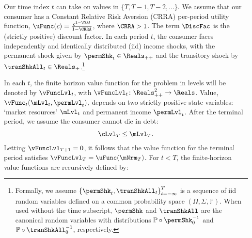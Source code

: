 \documentclass[\econtexRoot/BufferStockTheory]{subfiles}
\begin{document}
Our time index $t$ can take on values in $\{T,T-1,T-2,\dots \}$. We assume that our consumer has a Constant Relative Risk Aversion (CRRA) per-period utility function, $\uFunc(c)=\frac{c^{1-\CRRA}}{1-\CRRA}$, where $\CRRA>1$. The term $\DiscFac$ is the (strictly positive) discount factor. In each period $t$, the consumer faces independently and identically distributed (iid) income shocks, with the permanent shock given by $\permShk_{t} \in \Reals_{++}$ and the transitory shock by $\tranShkAll_{t} \in \Reals_{+}$.\footnote{Formally, we assume $\left\{\permShk_{t},\tranShkAll_{t}\right\}_{t=-\infty}^{T}$ is a sequence of iid random variables defined on a common probability space $(\Omega, \Sigma, \mathbb{P})$. When used without the time subscript, $\permShk$ and $\tranShkAll$ are the canonical random variables with distributions $\mathbb{P}\circ \permShk_{0}^{-1}$ and $\mathbb{P}\circ \tranShkAll_{0}^{-1}$, respectively.}

In each $t$, the finite horizon value function for the problem in levels will be denoted by $\vFuncLvl_{t}$, with $\vFuncLvl_{t}\colon \Reals_{++}^{2}\rightarrow \Reals$. Value, $\vFunc_{t}(\mLvl_{t}, \permLvl_{t})$, depends on two strictly positive state variables: `market resources' $\mLvl_{t}$ and permanent income $\permLvl_{t}$.
After the terminal period, we assume the consumer cannot die in debt:
%
\begin{equation}\label{eq:NoDebtAtDeath}
\cLvl_{T} \leq  \mLvl_{T} .
\end{equation}
%
Letting $\vFuncLvl_{T+1} = 0$, it follows that the value function for the terminal period satisfies $\vFuncLvl_{T} = \uFunc(\mNrm_{T})$.
For $t<T$, the finite-horizon value functions are recursively defined by:
\end{document}
